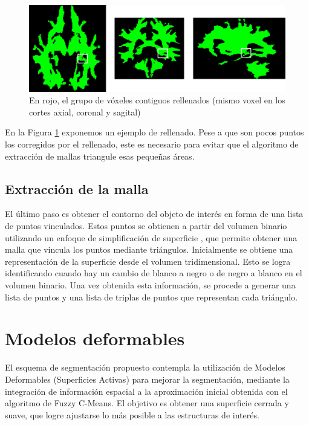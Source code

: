 \begin{figure}[H]
	\centering
	\includegraphics[scale=0.5]{images/rellenado.png}
	\caption{En rojo, el grupo de vóxeles contiguos rellenados (mismo voxel en los cortes axial, coronal y sagital)}
	\label{fig:rellenado}
\end{figure}

En la Figura \ref{fig:rellenado} exponemos un ejemplo de rellenado. Pese a que son pocos puntos los corregidos por el rellenado, este es necesario para evitar que el algoritmo de extracción de mallas triangule esas pequeñas áreas.

\subsection{Extracción de la malla}
El último paso es obtener el contorno del objeto de interés en forma de una lista de puntos vinculados. Estos puntos se obtienen a partir del volumen binario utilizando un enfoque de simplificación de superficie \citep{fang2009tetrahedral}, que permite obtener una malla que vincula los puntos mediante triángulos. Inicialmente se obtiene una representación de la superficie desde el volumen tridimensional. Esto se logra identificando cuando hay un cambio de blanco a negro o de negro a blanco en el volumen binario. Una vez obtenida esta información, se procede a generar una lista de puntos y una lista de triplas de puntos que representan cada triángulo.


\section{Modelos deformables}\label{section:modelos_deformables}
El esquema de segmentación propuesto contempla la utilización de Modelos Deformables (Superficies Activas) para mejorar la segmentación, mediante la integración de información espacial a la aproximación inicial obtenida con el algoritmo de Fuzzy C-Means. El objetivo es obtener una superficie cerrada y suave, que logre ajustarse lo más posible a las estructuras de interés.

